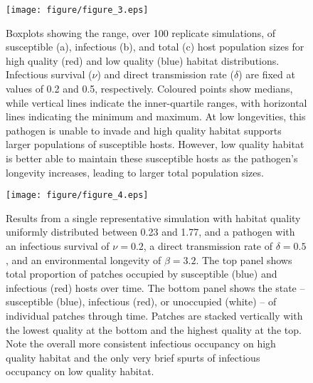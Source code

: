 \documentclass{article}
\begin{document}
\begin{figure}
\texttt{[image: figure/figure\_3.eps]}
\centering
\caption{Boxplots showing the range, over 100 replicate simulations, of susceptible (a), infectious (b), and total (c) host population sizes for high quality (red) and low quality (blue) habitat distributions.  Infectious survival ($\nu$) and direct transmission rate ($\delta$) are fixed at values of 0.2 and 0.5, respectively.  Coloured points show medians, while vertical lines indicate the inner-quartile ranges, with horizontal lines indicating the minimum and maximum.  At low longevities, this pathogen is unable to invade and high quality habitat supports larger populations of susceptible hosts.  However, low quality habitat is better able to maintain these susceptible hosts as the pathogen's longevity increases, leading to larger total population sizes.}
\label{popsizes}
\end{figure}

\begin{figure}
\texttt{[image: figure/figure\_4.eps]}
\centering
\caption{Results from a single representative simulation with habitat quality uniformly distributed between 0.23 and 1.77, and a pathogen with an infectious survival of $\nu = 0.2$, a direct transmission rate of $\delta = 0.5$, and an environmental longevity of $\beta = 3.2$.  The top panel shows total proportion of patches occupied by susceptible (blue) and infectious (red) hosts over time.  The bottom panel shows the state -- susceptible (blue), infectious (red), or unoccupied (white) -- of individual patches through time.  Patches are stacked vertically with the lowest quality at the bottom and the highest quality at the top.  Note the overall more consistent infectious occupancy on high quality habitat and the only very brief spurts of infectious occupancy on low quality habitat.}
\label{simvis}
\end{figure}

\clearpage
\end{document}
